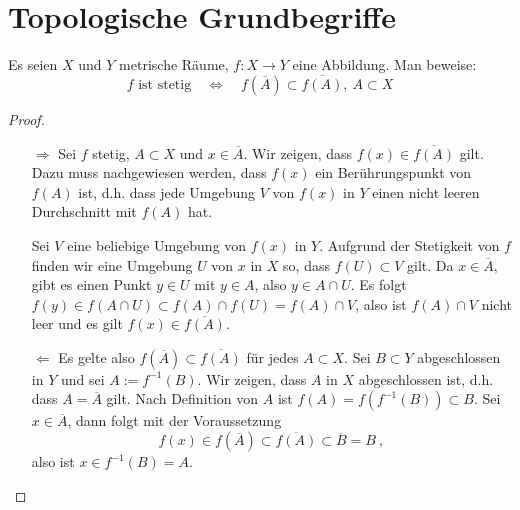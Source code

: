 \section{Topologische Grundbegriffe}
\setcounter{aufgabe}{11}
\begin{aufgabe}
	Es seien $X$ und $Y$ metrische Räume, $f: X \to Y$ eine Abbildung. Man beweise:
	\[
		f \text{ ist stetig} \quad \Leftrightarrow \quad f(\overline A) \subset \overline{f(A)}, \ A \subset X
	\]
\end{aufgabe}
\begin{proof}
	\begin{itemize}
		\item[\glqq$\Rightarrow$\grqq] Sei $f$ stetig, $A \subset X$ und $x \in \overline A$. Wir zeigen, 
		dass $f(x) \in \overline {f(A)}$ gilt. Dazu muss nachgewiesen werden, dass $f(x)$ ein 
		Berührungspunkt von $f(A)$ ist, d.h. dass jede Umgebung $V$ von $f(x)$ in $Y$ einen nicht
		leeren Durchschnitt mit $f(A)$ hat.

		Sei $V$ eine beliebige Umgebung von $f(x)$ in $Y$. Aufgrund der Stetigkeit von $f$ finden
		wir eine Umgebung $U$ von $x$ in $X$ so, dass $f(U) \subset V$ gilt. Da $x \in \overline A$, 
		gibt es einen Punkt $y \in U$ mit $y \in A$, also $y \in A \cap U$. Es folgt
		$f(y) \in f(A \cap U) \subset f(A) \cap f(U) = f(A) \cap V$, also ist $f(A) \cap V$ nicht leer
		und es gilt $f(x) \in \overline{ f(A) }$.
	\item[\glqq$\Leftarrow$\grqq] Es gelte also $f(\overline A) \subset \overline{f(A)}$ für
		jedes $A \subset X$. Sei $B \subset Y$ abgeschlossen in $Y$ und sei $A := f^{-1}(B)$.
		Wir zeigen, dass $A$ in $X$ abgeschlossen ist, d.h. dass $A = \overline A$ gilt.
		Nach Definition von $A$ ist $f(A) = f(f^{-1}(B)) \subset B$.
		Sei $x \in \overline A$, dann folgt mit der Voraussetzung
		\[
			f(x) \in f(\overline A) \subset \overline{ f(A) } \subset \overline B = B \ ,
		\]
		also ist $x \in f^{-1}(B) = A$.
	\end{itemize}
\end{proof}

